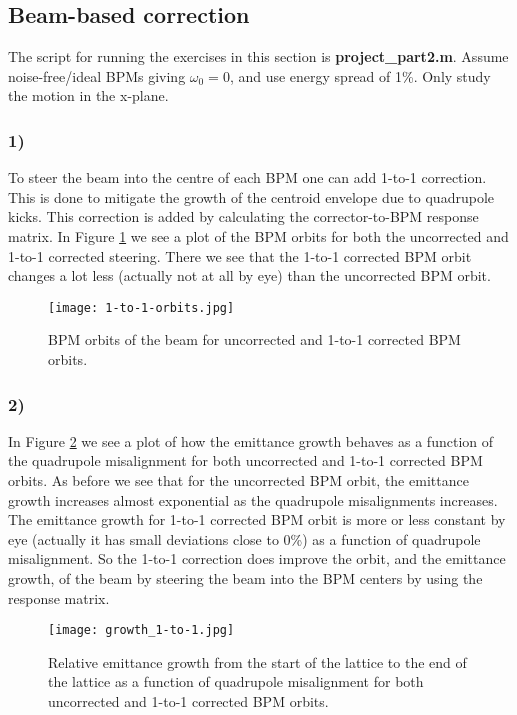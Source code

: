 \documentclass[12pt,a4paper,english]{article}
\begin{document}
\subsection*{Beam-based correction}
\label{subsect:Beam correction}
The script for running the exercises in this section is \textbf{project\_part2.m}. Assume noise-free/ideal BPMs giving $\omega_0=0$, and use energy spread of 1\%. Only study the motion in the x-plane.
\subsubsection*{1)}
To steer the beam into the centre of each BPM one can add 1-to-1 correction. This is done to mitigate the growth of the centroid envelope due to quadrupole kicks. This correction is added by calculating the corrector-to-BPM response matrix. In Figure \ref{fig:1-to-1_orbit} we see a plot of the BPM orbits for both the uncorrected and 1-to-1 corrected steering. There we see that the 1-to-1 corrected BPM orbit changes a lot less (actually not at all by eye) than the uncorrected BPM orbit.

\begin{figure}[htbp!]
	\centering\texttt{[image: 1-to-1-orbits.jpg]}
	\caption{BPM orbits of the beam for uncorrected and 1-to-1 corrected BPM orbits. \label{fig:1-to-1_orbit}}
\end{figure} 

\subsubsection*{2)}
In Figure \ref{fig:em_growth_1to1} we see a plot of how the emittance growth behaves as a function of the quadrupole misalignment for both uncorrected and 1-to-1 corrected BPM orbits. As before we see that for the uncorrected BPM orbit, the emittance growth increases almost exponential as the quadrupole misalignments increases. The emittance growth for 1-to-1 corrected BPM orbit is more or less constant by eye (actually it has small deviations close to 0\%) as a function of quadrupole misalignment. So the 1-to-1 correction does improve the orbit, and the emittance growth, of the beam by steering the beam into the BPM centers by using the response matrix.

\begin{figure}[htbp!]
	\centering\texttt{[image: growth\_1-to-1.jpg]}
	\caption{Relative emittance growth from the start of the lattice to the end of the lattice as a function of quadrupole misalignment for both uncorrected and 1-to-1 corrected BPM orbits. \label{fig:em_growth_1to1}}
\end{figure} 
\end{document}
